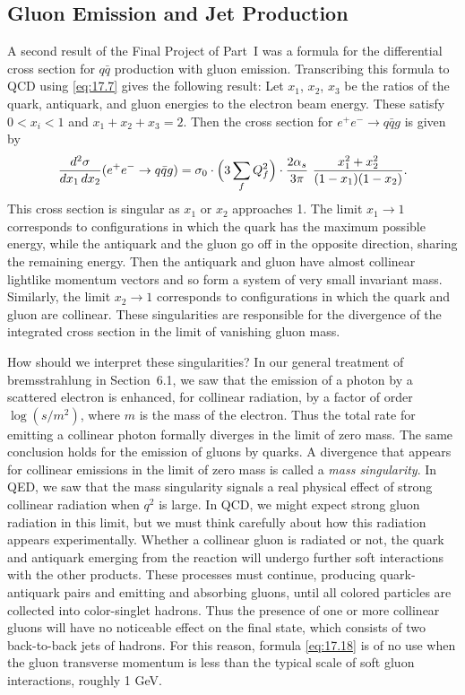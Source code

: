 \subsection{Gluon Emission and Jet Production}

A second result of the Final Project of Part~I was a formula for the
differential cross section for $q\bar{q}$ production with gluon emission.
Transcribing this formula to QCD using \eqref{eq:17.7} gives the following
result: Let $x_1$, $x_2$, $x_3$ be the ratios of the quark, antiquark, and
gluon energies to the electron beam energy.  These satisfy $0 < x_i < 1$ and
$x_1 + x_2 + x_3 = 2$.  Then the cross section for $e^{+}e^{-}\to q\bar{q}g$
is given by
\begin{equation}
  \frac{d^2\sigma}{dx_1\,dx_2}(e^{+}e^{-}\to q\bar{q}g)
  = \sigma_0\cdot\Bigl( 3\sum_f Q_f^2 \Bigr)\cdot
    \frac{2\alpha_s}{3\pi}\ \frac{x_1^2+x_2^2}{(1-x_1)(1-x_2)} .
  \label{eq:17.18}
\end{equation}
This cross section is singular as $x_1$ or $x_2$ approaches 1.  The limit
$x_1\to 1$ corresponds to configurations in which the quark has the maximum
possible energy, while the antiquark and the gluon go off in the opposite
direction, sharing the remaining energy.  Then the antiquark and gluon have
almost collinear lightlike momentum vectors and so form a system of very
small invariant mass.  Similarly, the limit $x_2\to 1$ corresponds to
configurations in which the quark and gluon are collinear.  These
singularities are responsible for the divergence of the integrated cross
section in the limit of vanishing gluon mass.

How should we interpret these singularities?  In our general treatment of
bremsstrahlung in Section~6.1, we saw that the emission of a photon by a
scattered electron is enhanced, for collinear radiation, by a factor of order
$\log(s/m^2)$, where $m$ is the mass of the electron.  Thus the total rate
for emitting a collinear photon formally diverges in the limit of zero mass.
The same conclusion holds for the emission of gluons by quarks.  A divergence
that appears for collinear emissions in the limit of zero mass is called a
\emph{mass singularity}.  In QED, we saw that the mass singularity signals a
real physical effect of strong collinear radiation when $q^2$ is large.  In
QCD, we might expect strong gluon radiation in this limit, but we must think
carefully about how this radiation appears experimentally.  Whether a
collinear gluon is radiated or not, the quark and antiquark emerging from the
reaction will undergo further soft interactions with the other products.
These processes must continue, producing quark-antiquark pairs and emitting
and absorbing gluons, until all colored particles are collected into
color-singlet hadrons.  Thus the presence of one or more collinear gluons will
have no noticeable effect on the final state, which consists of two
back-to-back jets of hadrons.  For this reason, formula \eqref{eq:17.18} is
of no use when the gluon transverse momentum is less than the typical scale
of soft gluon interactions, roughly 1 GeV.

